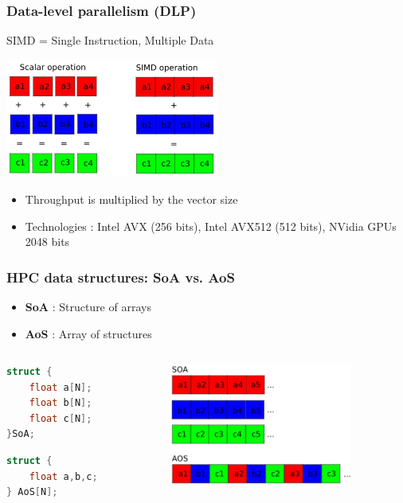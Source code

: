 \begin{frame}[containsverbatim]
\frametitle{Data-level parallelism (DLP)}
SIMD = Single Instruction, Multiple Data
\begin{center}
\includegraphics[width=7cm]{DayGilles/images/simd.jpg}
\end{center}
\vfill
\begin{itemize}
\item Throughput is multiplied by the vector size
\item Technologies : Intel AVX (256 bits), Intel AVX512 (512 bits), NVidia GPUs 2048 bits
\end{itemize}
\end{frame}




\begin{frame}[containsverbatim]
\frametitle{HPC data structures: SoA vs. AoS}
\begin{itemize}
\item \textbf{SoA} : Structure of arrays
\item \textbf{AoS} : Array of structures
\end{itemize}
\begin{columns}[c]
	\begin{column}{4cm}
	\begin{lstlisting}[language=C]
struct {
    float a[N];
    float b[N];
    float c[N];
}SoA;
	\end{lstlisting}
	\vfill
	\begin{lstlisting}[language=C]
struct {
    float a,b,c;
} AoS[N];
	\end{lstlisting}
	\end{column} 
	\begin{column}{6cm}
	\includegraphics[width=6cm]{DayGilles/images/soa-aos.jpg}
	\end{column}
\end{columns} 
\end{frame}


